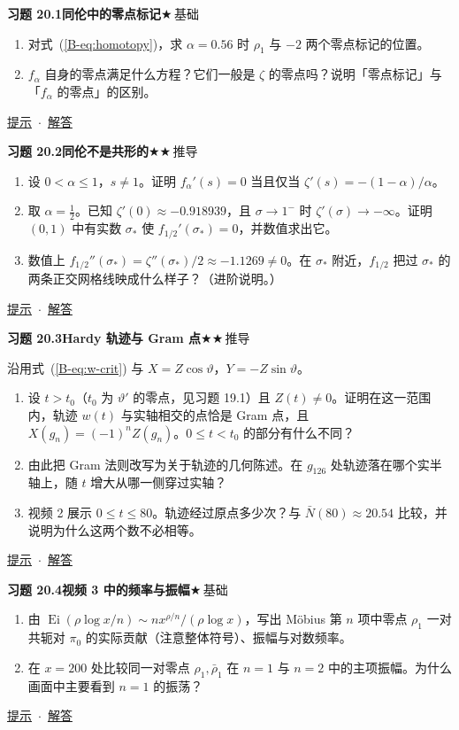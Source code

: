 \documentclass[11pt,a4paper]{article}
\DeclareMathOperator{\Ei}{Ei}
\newcommand{\bref}[1]{\ref*{B-#1}}
\newcommand{\lvI}{$\bigstar$\,基础}
\newcommand{\lvII}{$\bigstar\bigstar$\,推导}
\newcommand{\Q}[3]{%
  \par\addvspace{1.1em}\noindent
  \hypertarget{q:#1}{}\textbf{习题 #1}\quad\textbf{#3}\hfill{\small #2}\par
  \nopagebreak\smallskip}
\newcommand{\toHint}[1]{\hfill{\small\hyperlink{h:#1}{提示}\ $\cdot$\ \hyperlink{s:#1}{解答}}}
\begin{document}
\Q{20.1}{\lvI}{同伦中的零点标记}
\begin{enumerate}
  \item 对式~(\bref{eq:homotopy})，求 $\alpha=0.56$ 时 $\rho_1$ 与 $-2$ 两个零点标记的位置。
  \item $f_\alpha$ 自身的零点满足什么方程？它们一般是 $\zeta$ 的零点吗？说明「零点标记」与「$f_\alpha$ 的零点」的区别。
\end{enumerate}
\toHint{20.1}

\Q{20.2}{\lvII}{同伦不是共形的}
\begin{enumerate}
  \item 设 $0<\alpha\le1$，$s\ne1$。证明 $f_\alpha'(s)=0$ 当且仅当 $\zeta'(s)=-(1-\alpha)/\alpha$。
  \item 取 $\alpha=\frac12$。已知 $\zeta'(0)\approx-0.918939$，且 $\sigma\to1^-$ 时 $\zeta'(\sigma)\to-\infty$。证明 $(0,1)$ 中有实数 $\sigma_*$ 使 $f_{1/2}'(\sigma_*)=0$，并数值求出它。
  \item 数值上 $f_{1/2}''(\sigma_*)=\zeta''(\sigma_*)/2\approx-1.1269\ne0$。在 $\sigma_*$ 附近，$f_{1/2}$ 把过 $\sigma_*$ 的两条正交网格线映成什么样子？（进阶说明。）
\end{enumerate}
\toHint{20.2}

\Q{20.3}{\lvII}{Hardy 轨迹与 Gram 点}
沿用式~(\bref{eq:w-crit}) 与 $X=Z\cos\vartheta$，$Y=-Z\sin\vartheta$。
\begin{enumerate}
  \item 设 $t>t_0$（$t_0$ 为 $\vartheta'$ 的零点，见习题 19.1）且 $Z(t)\ne0$。证明在这一范围内，轨迹 $w(t)$ 与实轴相交的点恰是 Gram 点，且 $X(g_n)=(-1)^nZ(g_n)$。$0\le t<t_0$ 的部分有什么不同？
  \item 由此把 Gram 法则改写为关于轨迹的几何陈述。在 $g_{126}$ 处轨迹落在哪个实半轴上，随 $t$ 增大从哪一侧穿过实轴？
  \item 视频 2 展示 $0\le t\le80$。轨迹经过原点多少次？与 $\bar N(80)\approx20.54$ 比较，并说明为什么这两个数不必相等。
\end{enumerate}
\toHint{20.3}

\Q{20.4}{\lvI}{视频 3 中的频率与振幅}
\begin{enumerate}
  \item 由 $\Ei(\rho\log x/n)\sim nx^{\rho/n}/(\rho\log x)$，写出 Möbius 第 $n$ 项中零点 $\rho_1$ 一对共轭对 $\pi_0$ 的实际贡献（注意整体符号）、振幅与对数频率。
  \item 在 $x=200$ 处比较同一对零点 $\rho_1,\bar\rho_1$ 在 $n=1$ 与 $n=2$ 中的主项振幅。为什么画面中主要看到 $n=1$ 的振荡？
\end{enumerate}
\toHint{20.4}
\end{document}
